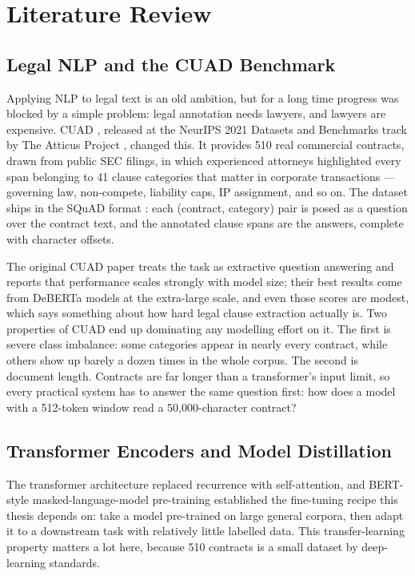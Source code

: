 \chapter{Literature Review}

\section{Legal NLP and the CUAD Benchmark}
Applying NLP to legal text is an old ambition, but for a long time progress was blocked by a simple problem: legal annotation needs lawyers, and lawyers are expensive. CUAD \cite{hendrycks2021cuad}, released at the NeurIPS 2021 Datasets and Benchmarks track by The Atticus Project \cite{atticus2021}, changed this. It provides 510 real commercial contracts, drawn from public SEC filings, in which experienced attorneys highlighted every span belonging to 41 clause categories that matter in corporate transactions --- governing law, non-compete, liability caps, IP assignment, and so on. The dataset ships in the SQuAD format \cite{rajpurkar2016squad}: each (contract, category) pair is posed as a question over the contract text, and the annotated clause spans are the answers, complete with character offsets.

The original CUAD paper treats the task as extractive question answering and reports that performance scales strongly with model size; their best results come from DeBERTa models at the extra-large scale, and even those scores are modest, which says something about how hard legal clause extraction actually is. Two properties of CUAD end up dominating any modelling effort on it. The first is severe class imbalance: some categories appear in nearly every contract, while others show up barely a dozen times in the whole corpus. The second is document length. Contracts are far longer than a transformer's input limit, so every practical system has to answer the same question first: how does a model with a 512-token window read a 50{,}000-character contract?

\section{Transformer Encoders and Model Distillation}
The transformer architecture \cite{vaswani2017attention} replaced recurrence with self-attention, and BERT-style masked-language-model pre-training \cite{devlin2019bert} established the fine-tuning recipe this thesis depends on: take a model pre-trained on large general corpora, then adapt it to a downstream task with relatively little labelled data. This transfer-learning property matters a lot here, because 510 contracts is a small dataset by deep-learning standards.

